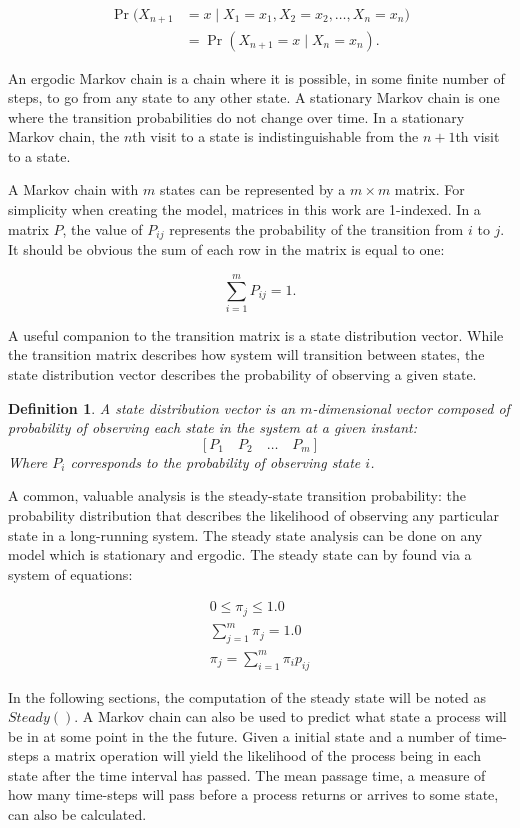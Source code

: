 \documentclass[12pt,oneside]{article}
\newtheorem{pdef}{Definition}
\begin{document}
\begin{align} \Pr(X_{n+1}&=x\mid X_1=x_1, X_2=x_2, \ldots, X_n=x_n)
\nonumber \\ &= \Pr(X_{n+1}=x\mid X_n=x_n). \end{align}

An ergodic Markov chain is a chain where it is possible, in some finite number of steps, to go from any state to any other state.
A stationary Markov chain is one where the transition probabilities do not change over time.
In a stationary Markov chain, the $n$th visit to a state is indistinguishable from the $n+1$th visit to a state.

A Markov chain with $m$ states can be represented by a $m\times m$ matrix.
For simplicity when creating the model, matrices in this work are 1-indexed.
In a matrix $P$, the value of $P_{ij}$ represents the probability of the transition from $i$ to $j$.
It should be obvious the sum of each row in the matrix is equal to one:

\begin{equation} \sum_{i=1}^{m} P_{ij} = 1. \end{equation}

A useful companion to the transition matrix is a state distribution vector.
While the transition matrix describes how system will transition between states, the state distribution vector describes the probability of observing a given state.

\begin{pdef}
A state distribution vector is an $m$-dimensional vector composed of probability of observing each state in the system at a given instant:
\[ [P_{1} \quad P_{2} \quad \ldots \quad P_{m} ] \]
Where $P_{i}$ corresponds to the probability of observing state $i$.
\end{pdef}

A common, valuable analysis is the steady-state transition probability: the probability distribution that describes the likelihood of observing any particular state in a long-running system. The steady state analysis can be done on any model which is stationary and ergodic. The steady state can by found via a system of equations: \cite{MARKOV3}

\begin{align}
0\leq\pi_j\leq1.0 \\
\sum_{j = 1}^{m}\pi_j = 1.0 \\
\pi_j = \sum_{i=1}^{m} \pi_i p_{ij}
\end{align}

In the following sections, the computation of the steady state will be noted as $Steady()$.
A Markov chain can also be used to predict what state a process will be in at some point in the the future.
Given a initial state and a number of time-steps a matrix operation will yield the likelihood of the process being in each state after the time interval has passed.
The mean passage time, a measure of how many time-steps will pass before a process returns or arrives to some state, can also be calculated.
\end{document}
